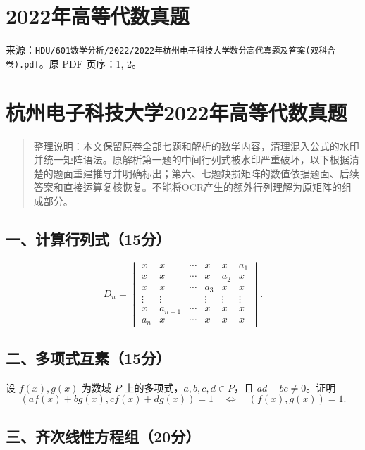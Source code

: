\documentclass[11pt,fontset=fandol]{ctexart}
\begin{document}
\section{2022年高等代数真题}\label{ux5e74ux9ad8ux7b49ux4ee3ux6570ux771fux9898}

来源：\texttt{HDU/601数学分析/2022/2022年杭州电子科技大学数分高代真题及答案(双科合卷).pdf}。原
PDF 页序：1, 2。

\section{杭州电子科技大学2022年高等代数真题}\label{ux676dux5ddeux7535ux5b50ux79d1ux6280ux5927ux5b662022ux5e74ux9ad8ux7b49ux4ee3ux6570ux771fux9898}

\begin{quote}
整理说明：本文保留原卷全部七题和解析的数学内容，清理混入公式的水印并统一矩阵语法。原解析第一题的中间行列式被水印严重破坏，以下根据清楚的题面重建推导并明确标出；第六、七题缺损矩阵的数值依据题面、后续答案和直接运算复核恢复。不能将OCR产生的额外行列理解为原矩阵的组成部分。
\end{quote}

\subsection{一、计算行列式（15分）}\label{ux4e00ux8ba1ux7b97ux884cux5217ux5f0f15ux5206}

\[
D_n=\begin{vmatrix}
x&x&\cdots&x&x&a_1\\
x&x&\cdots&x&a_2&x\\
x&x&\cdots&a_3&x&x\\
\vdots&\vdots&&\vdots&\vdots&\vdots\\
x&a_{n-1}&\cdots&x&x&x\\
a_n&x&\cdots&x&x&x
\end{vmatrix}.
\]

\subsection{二、多项式互素（15分）}\label{ux4e8cux591aux9879ux5f0fux4e92ux7d2015ux5206}

设 \(f(x),g(x)\) 为数域 \(P\) 上的多项式，\(a,b,c,d\in P\)，且
\(ad-bc\ne0\)。证明 \[
(af(x)+bg(x),cf(x)+dg(x))=1
\quad\Longleftrightarrow\quad(f(x),g(x))=1.
\]

\subsection{三、齐次线性方程组（20分）}\label{ux4e09ux9f50ux6b21ux7ebfux6027ux65b9ux7a0bux7ec420ux5206}
\end{document}
